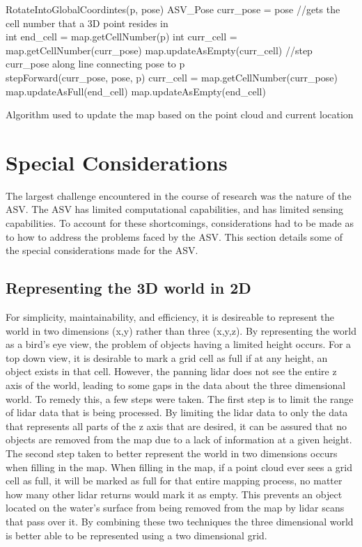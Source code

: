 \documentclass[10pt]{IEEEtran}
\begin{document}
\begin{algorithm}
	\label{mapalg}
	{
		RotateIntoGlobalCoordintes(p, pose)\;
		ASV\_Pose curr\_pose = pose\;
		//gets the cell number that a 3D point resides in\\
		int end\_cell = map.getCellNumber(p)\;
		int curr\_cell = map.getCellNumber(curr\_pose)\;
		{
			map.updateAsEmpty(curr\_cell)\; 
			//step curr\_pose along line connecting pose to p \\
			stepForward(curr\_pose, pose, p)\;
			curr\_cell = map.getCellNumber(curr\_pose)\;
		}
		{
			map.updateAsFull(end\_cell)\;
		}{
			map.updateAsEmpty(end\_cell)\;
		}
	}

	\caption{Algorithm used to update the map based on the point cloud and current location}
\end{algorithm}

\section{Special Considerations}
The largest challenge encountered in the course of research was the nature of the ASV.  
The ASV has limited computational capabilities, and has limited sensing capabilities.  
To account for these shortcomings, considerations had to be made as to how to address the
problems faced by the ASV.  This section details some of the special considerations made
for the ASV.

\subsection{Representing the 3D world in 2D}
For simplicity, maintainability, and efficiency, it is desireable to represent the world in
two dimensions (x,y) rather than three (x,y,z).  By representing the world as a
bird's eye view, the problem of objects having a limited height occurs.
For a top down view, it is desirable to mark a grid cell as full if at any height,
an object exists in that cell.  However, the panning lidar does not see the entire z axis 
of the world, leading to some gaps in the data about the three dimensional
world.  To remedy this, a few steps were taken.  The first step is to limit the range
of lidar data that is being processed.  By limiting the lidar data to only the data that
represents all parts of the z axis that are desired, it can be assured that no objects are
removed from the map due to a lack of information at a given height.  The second
step taken to better represent the world in two dimensions occurs when filling in the map.
When filling in the map, if a point cloud ever sees a grid cell as full, it will be marked
as full for that entire mapping process, no matter how many other lidar returns would
mark it as empty.  This prevents an object located on the
water's surface from being removed from the map by lidar scans that pass over it.  By 
combining these two techniques the three dimensional world is better able to be
represented using a two dimensional grid.
\end{document}
